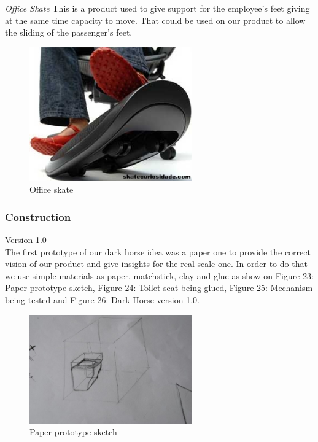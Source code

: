 \emph{Office Skate} This is a product used to give support for the employee’s feet giving at the same time capacity to move. That could be used on our product to allow the sliding of the passenger’s feet.

\begin{figure}[h]
\centering
\includegraphics[width=7cm]{brazil_images/image024.jpg}
\caption{Office skate}%
\label{fig:office_skate}
\end{figure}


\subsubsection{Construction}
Version 1.0 \\

The first prototype of our dark horse idea was a paper one to provide the correct vision of our product and give insights for the real scale one. In order to do that we use simple materials as paper, matchstick, clay and glue as show on Figure 23: Paper prototype sketch, Figure 24: Toilet seat being glued, Figure 25: Mechanism being tested and Figure 26: Dark Horse version 1.0.

\begin{figure}[h]
\centering
\includegraphics[width=7cm]{brazil_images/image025.jpg}
\caption{Paper prototype sketch}
\label{fig:paper_prototype}
\end{figure}



